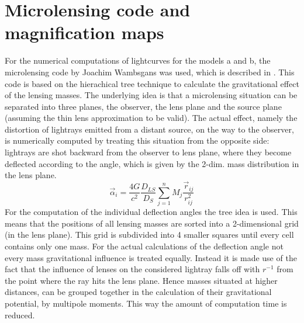 \section{Microlensing code and magnification maps}
For the numerical computations of lightcurves for the models a and b, the microlensing code by Joachim Wambsgans was used, which is described in \cite{1999A&A...346L...5W}. This code is based on the hierachical tree technique to calculate the gravitational effect of the lensing masses. The underlying idea is that a microlensing situation can be separated into three planes, the observer, the lens plane and the source plane (assuming the thin lens approximation to be valid). The actual effect, namely the distortion of lightrays emitted from a distant source, on the way to the observer, is numerically computed by treating this situation from the opposite side: lightrays are shot backward from the observer to lens plane, where they become deflected according to the angle, which is given by the 2-dim. mass distribution in the lens plane.
\begin{equation}
\vec{\alpha}_{i}=\frac{4G}{c^{2}} \frac{D_{LS}}{D_{S}}\sum_{j=1}^{n}M_j \frac{\vec{r}_{ij}}{r^2_{ij}} 
\end{equation}  
For the computation of the individual deflection angles the tree idea is used. This means that the positions of all lensing masses are sorted into a 2-dimensional grid (in the lens plane). This grid is subdivided into 4 smaller squares until every cell contains only one mass. For the actual calculations of the deflection angle not every mass gravitational influence is treated equally. Instead it is made use of the fact that the influence of lenses on the considered lightray falls off with $r^{-1}$ from the point where the ray hits the lens plane. Hence masses situated at higher distances, can be grouped together in the calculation of their gravitational potential, by multipole moments. This way the amount of computation time is reduced. \\
